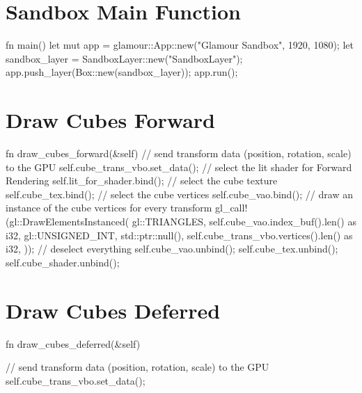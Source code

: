 \begin{appendices}
  \noindent\begin{minipage}{\textwidth}
    \section{Sandbox Main Function}\label{app:sandbox-main}
  \begin{rustcode}
fn main() {
    let mut app = glamour::App::new("Glamour Sandbox", 1920, 1080);
    let sandbox_layer = SandboxLayer::new("SandboxLayer");
    app.push_layer(Box::new(sandbox_layer));
    app.run();
}
  \end{rustcode}
    \vspace{\parskip}\end{minipage}

  \noindent\begin{minipage}{\textwidth}
    \section{Draw Cubes Forward}\label{app:draw-cubes-forward}
  \begin{rustcode}
fn draw_cubes_forward(&self) {
    // send transform data (position, rotation, scale) to the GPU
    self.cube_trans_vbo.set_data();
    // select the lit shader for Forward Rendering
    self.lit_for_shader.bind();
    // select the cube texture
    self.cube_tex.bind();
    // select the cube vertices
    self.cube_vao.bind();
    // draw an instance of the cube vertices for every transform
    gl_call!(gl::DrawElementsInstanced(
        gl::TRIANGLES,
        self.cube_vao.index_buf().len() as i32,
        gl::UNSIGNED_INT,
        std::ptr::null(),
        self.cube_trans_vbo.vertices().len() as i32,
    ));
    // deselect everything
    self.cube_vao.unbind();
    self.cube_tex.unbind();
    self.cube_shader.unbind();
}
  \end{rustcode}
    \vspace{\parskip}\end{minipage}

  \noindent\begin{minipage}{\textwidth}
    \section{Draw Cubes Deferred}\label{app:draw-cubes-deferred}
  \begin{rustcode}
fn draw_cubes_deferred(&self) {
    // send transform data (position, rotation, scale) to the GPU
    self.cube_trans_vbo.set_data();

}
\end{rustcode}
\end{minipage}
\end{appendices}
